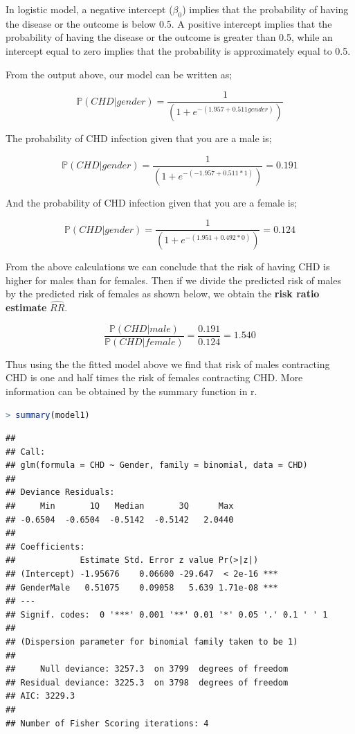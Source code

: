 \documentclass[
]{article}
\begin{document}
In logistic model, a negative intercept (\(\beta_0\)) implies that the
probability of having the disease or the outcome is below 0.5. A
positive intercept implies that the probability of having the disease or
the outcome is greater than 0.5, while an intercept equal to zero
implies that the probability is approximately equal to 0.5.

From the output above, our model can be written as;

\[\mathbb{P}(CHD|gender)=\frac{1}{(1+e^{-(1.957+0.511gender)})}\]

The probability of CHD infection given that you are a male is;

\[\mathbb{P}(CHD|gender)=\frac{1}{(1+e^{-(-1.957+0.511*1)})}=0.191\]

And the probability of CHD infection given that you are a female is;

\[\mathbb{P}(CHD|gender)=\frac{1}{(1+e^{-(1.951+0.492*0)})}=0.124\]

From the above calculations we can conclude that the risk of having CHD
is higher for males than for females. Then if we divide the predicted
risk of males by the predicted risk of females as shown below, we obtain
the \textbf{risk ratio estimate} \(\hat{RR}\).

\[\frac{\mathbb{P}(CHD|male)}{\mathbb{P}(CHD|female)}=\frac{0.191}{0.124}=1.540\]

Thus using the the fitted model above we find that risk of males
contracting CHD is one and half times the risk of females contracting
CHD. More information can be obtained by the summary function in r.

\begin{lstlisting}[language=R]
> summary(model1)
\end{lstlisting}

\begin{lstlisting}
## 
## Call:
## glm(formula = CHD ~ Gender, family = binomial, data = CHD)
## 
## Deviance Residuals: 
##     Min       1Q   Median       3Q      Max  
## -0.6504  -0.6504  -0.5142  -0.5142   2.0440  
## 
## Coefficients:
##             Estimate Std. Error z value Pr(>|z|)    
## (Intercept) -1.95676    0.06600 -29.647  < 2e-16 ***
## GenderMale   0.51075    0.09058   5.639 1.71e-08 ***
## ---
## Signif. codes:  0 '***' 0.001 '**' 0.01 '*' 0.05 '.' 0.1 ' ' 1
## 
## (Dispersion parameter for binomial family taken to be 1)
## 
##     Null deviance: 3257.3  on 3799  degrees of freedom
## Residual deviance: 3225.3  on 3798  degrees of freedom
## AIC: 3229.3
## 
## Number of Fisher Scoring iterations: 4
\end{lstlisting}
\end{document}
